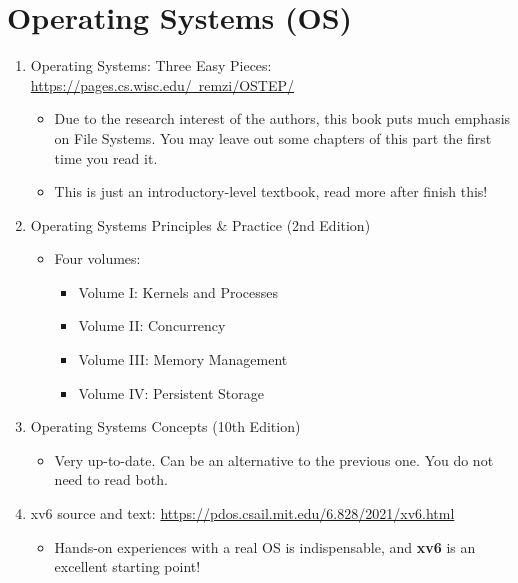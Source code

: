 \documentclass{article}
\begin{document}
\section{Operating Systems (OS)}
\begin{enumerate}
    \item Operating Systems: Three Easy Pieces:
    \href{https://pages.cs.wisc.edu/~remzi/OSTEP/}{https://pages.cs.wisc.edu/~remzi/OSTEP/}
    \begin{itemize}
        \item Due to the research interest of the authors, this book puts much emphasis on File Systems.
        You may leave out some chapters of this part the first time you read it.
        \item This is just an introductory-level textbook, read more after finish this!
    \end{itemize}
    \item Operating Systems Principles \& Practice (2nd Edition)
    \begin{itemize}
        \item Four volumes:
        \begin{itemize}
            \item Volume I: Kernels and Processes \cite{anderson2014operating1}
            \item Volume II: Concurrency \cite{andersonoperating2}
            \item Volume III: Memory Management \cite{andersonoperating3}
            \item Volume IV: Persistent Storage \cite{andersonoperating4}
        \end{itemize}
    \end{itemize}
    \item Operating Systems Concepts (10th Edition) \cite{peterson1985operating}
    \begin{itemize}
        \item Very up-to-date.
        Can be an alternative to the previous one.
        You do not need to read both.
    \end{itemize}
    \item xv6 source and text:
    \href{https://pdos.csail.mit.edu/6.828/2021/xv6.html}{https://pdos.csail.mit.edu/6.828/2021/xv6.html}
    \begin{itemize}
        \item Hands-on experiences with a real OS is indispensable, and \textbf{xv6} is an excellent starting point!
    \end{itemize}    

\end{enumerate}
\end{document}
